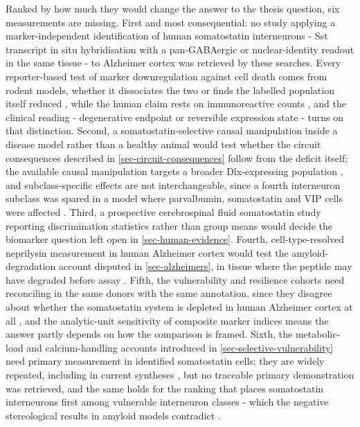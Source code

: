 \documentclass[11pt]{article}
\begin{document}
Ranked by how much they would change the answer to the thesis question, six measurements are missing. First and most consequential: no study applying a marker-independent identification of human somatostatin interneurons - Sst transcript in situ hybridisation with a pan-GABAergic or nuclear-identity readout in the same tissue - to Alzheimer cortex was retrieved by these searches. Every reporter-based test of marker downregulation against cell death comes from rodent models, whether it dissociates the two \citep{Voelkl2022} or finds the labelled population itself reduced \citep{Drake2024}, while the human claim rests on immunoreactive counts \citep{SaizSanchez2014,SanchezMejias2019}, and the clinical reading - degenerative endpoint or reversible expression state - turns on that distinction. Second, a somatostatin-selective causal manipulation inside a disease model rather than a healthy animal would test whether the circuit consequences described in \ref{sec-circuit-consequences} follow from the deficit itself; the available causal manipulation targets a broader Dlx-expressing population \citep{Matringhen2025}, and subclass-specific effects are not interchangeable, since a fourth interneuron subclass was spared in a model where parvalbumin, somatostatin and VIP cells were affected \citep{Liebergall2024}. Third, a prospective cerebrospinal fluid somatostatin study reporting discrimination statistics rather than group means would decide the biomarker question left open in \ref{sec-human-evidence}. Fourth, cell-type-resolved neprilysin measurement in human Alzheimer cortex would test the amyloid-degradation account disputed in \ref{sec-alzheimers}, in tissue where the peptide may have degraded before assay \citep{Salviati2025}. Fifth, the vulnerability and resilience cohorts need reconciling in the same donors with the same annotation, since they disagree about whether the somatostatin system is depleted in human Alzheimer cortex at all \citep{SaizSanchez2014,Morgan2024a}, and the analytic-unit sensitivity of composite marker indices \citep{Dienel2025} means the answer partly depends on how the comparison is framed. Sixth, the metabolic-load and calcium-handling accounts introduced in \ref{sec-selective-vulnerability} need primary measurement in identified somatostatin cells; they are widely repeated, including in current syntheses \citep{Okechukwu2026}, but no traceable primary demonstration was retrieved, and the same holds for the ranking that places somatostatin interneurons first among vulnerable interneuron classes - which the negative stereological results in amyloid models contradict \citep{Futacsi2025,Sos2020}.
\end{document}
